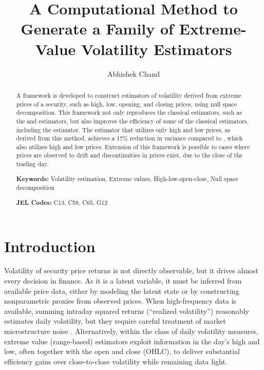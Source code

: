 

\title{\textbf{A Computational Method to Generate a Family of Extreme-Value Volatility Estimators}}
\author{Abhishek Chand}
\date{}


\maketitle

\begin{abstract}

A framework is developed to construct estimators of volatility derived from extreme prices of a security, such as high, low, opening, and closing prices, using null space decomposition. This framework not only reproduces the classical estimators, such as the \citet{parkinson1980ExtremeValueMethod} and \citet{garman1980EstimationSecurityPrice} estimators, but also improves the efficiency of some of the classical estimators, including the \citet{parkinson1980ExtremeValueMethod} estimator. The estimator that utilizes only high and low prices, as derived from this method, achieves a 17\% reduction in variance compared to \citet{parkinson1980ExtremeValueMethod}, which also utilizes high and low prices. Extension of this framework is possible to cases where prices are observed to drift and discontinuities in prices exist, due to the close of the trading day.  

\vspace{0.5cm}
\noindent\textbf{Keywords:} Volatility estimation, Extreme values, High-low-open-close, Null space decomposition

\vspace{0.3cm}
\noindent\textbf{JEL Codes:} C13, C58, C65, G12

\end{abstract}

\newpage
\section{Introduction}

Volatility of security price returns is not directly observable, but it drives almost every decision in finance. As it is a latent variable, it must be inferred from available price data, either by modeling the latent state or by constructing nonparametric proxies from observed prices. When high-frequency data is available, summing intraday squared returns (“realized volatility”) reasonably estimates daily volatility, but they require careful treatment of market microstructure noise \citet{alizadeh2002RangeBasedEstimationStochastica}. Alternatively, within the class of daily volatility measures, extreme value (range-based) estimators exploit information in the day’s high and low, often together with the open and close (OHLC), to deliver substantial efficiency gains over close-to-close volatility while remaining data light.


